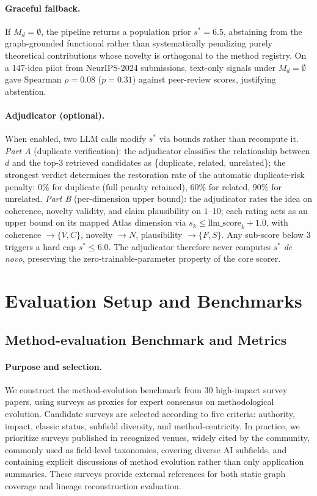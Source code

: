 \documentclass{opendatalab}
\begin{document}
\paragraph{Graceful fallback.}
If $M_d=\emptyset$, the pipeline returns a population prior $s^\ast=6.5$, abstaining from the graph-grounded
functional rather than systematically penalizing purely theoretical contributions whose novelty is orthogonal to
the method registry. On a 147-idea pilot from NeurIPS-2024 submissions, text-only signals under $M_d=\emptyset$
gave Spearman $\rho=0.08$ ($p=0.31$) against peer-review scores, justifying abstention.

\paragraph{Adjudicator (optional).}
When enabled, two LLM calls modify $s^\ast$ via bounds rather than recompute it. \emph{Part A} (duplicate
verification): the adjudicator classifies the relationship between $d$ and the top-3 retrieved candidates as
\{duplicate, related, unrelated\}; the strongest verdict determines the restoration rate of the automatic
duplicate-risk penalty: $0\%$ for duplicate (full penalty retained), $60\%$ for related, $90\%$ for unrelated.
\emph{Part B} (per-dimension upper bound): the adjudicator rates the idea on coherence, novelty validity, and
claim plausibility on $1$--$10$; each rating acts as an upper bound on its mapped Atlas dimension via
$s_k\le\mathrm{llm\_score}_k+1.0$, with coherence $\to\{V,C\}$, novelty $\to N$, plausibility $\to\{F,S\}$. Any
sub-score below $3$ triggers a hard cap $s^\ast\le 6.0$. The adjudicator therefore never computes $s^\ast$
\emph{de novo}, preserving the zero-trainable-parameter property of the core scorer.




\section{Evaluation Setup and Benchmarks}
\label{app:setup}

\subsection{Method-evaluation Benchmark and Metrics}
\label{app:survey-benchmark}

\paragraph{Purpose and selection.}
We construct the method-evolution benchmark from 30 high-impact survey papers, using surveys as proxies for expert consensus on methodological evolution.
Candidate surveys are selected according to five criteria: authority, impact, classic status, subfield diversity, and method-centricity. In practice, we
prioritize surveys published in recognized venues, widely cited by the community, commonly used as field-level taxonomies, covering diverse AI subfields,
and containing explicit discussions of method evolution rather than only application summaries. These surveys provide external references for both static
graph coverage and lineage reconstruction evaluation.
\end{document}
